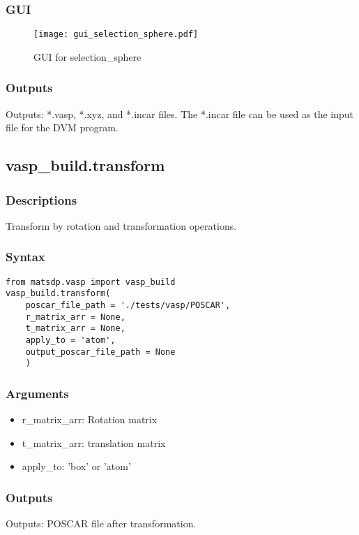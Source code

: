 \documentclass[12pt]{book}
\begin{document}
\subsubsection{GUI}
\begin{figure}[htbp]
\centering
\texttt{[image: gui\_selection\_sphere.pdf]}
\caption{GUI for selection\_sphere}
\label{fig:GUI_selection_sphere}
\end{figure}

\subsubsection{Outputs}
Outputs: *.vasp, *.xyz, and *.incar files. The *.incar file can be used as the input file for the DVM program.


\subsection{vasp\_build.transform}
\subsubsection{Descriptions}
 Transform by rotation and transformation operations.
\subsubsection{Syntax}
\begin{lstlisting}
from matsdp.vasp import vasp_build
vasp_build.transform(
    poscar_file_path = './tests/vasp/POSCAR', 
    r_matrix_arr = None, 
    t_matrix_arr = None, 
    apply_to = 'atom', 
    output_poscar_file_path = None
    )
\end{lstlisting}

\subsubsection{Arguments}
\begin{itemize}
\item r\_matrix\_arr: Rotation matrix
\item t\_matrix\_arr: translation matrix
\item apply\_to: 'box' or 'atom'
\end{itemize}

\subsubsection{Outputs}
Outputs: POSCAR file after transformation.
\end{document}
